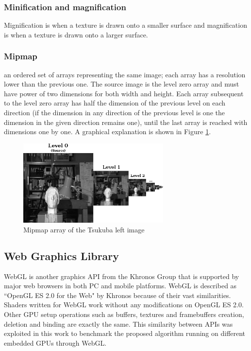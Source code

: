 \documentclass[conference]{IEEEtran}
\begin{document}
		\subsubsection{Minification and magnification}
Mignification is when a texture is drawn onto a smaller surface and magnification is when a texture is drawn onto a larger surface.

		\subsubsection{Mipmap}
an ordered set of arrays representing the same image; each array has a resolution lower than the previous one. The source image is the level zero array and must have power of two dimensions for both width and height. Each array subsequent to the level zero array has half the dimension of the previous level on each direction (if the dimension in any direction of the previous level is one the dimension in the given direction remains one), until the last array is reached with dimensions one by one. A graphical explanation is shown in Figure \ref{fig:mipmap_explanation}.

\begin{figure}[!t]
	\centering
	\includegraphics[width=3.0in]{mipmap_explanation}
	\caption{Mipmap array of the Tsukuba left image}
	\label{fig:mipmap_explanation}
\end{figure}

	\subsection{Web Graphics Library}
WebGL is another graphics API from the Khronos Group that is supported by major web browsers in both PC and mobile platforms. WebGL is described as ``OpenGL ES 2.0 for the Web" by Khronos because of their vast similarities. Shaders written for WebGL work without any modifications on OpenGL ES 2.0. Other GPU setup operations such as buffers, textures and framebuffers creation, deletion and binding are exactly the same. This similarity between APIs was exploited in this work to benchmark the proposed algorithm running on different embedded GPUs through WebGL.
\end{document}
